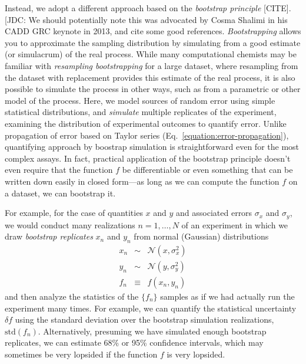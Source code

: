 \documentclass[aps,pre,twocolumn,nofootinbib,superscriptaddress,linenumbers]{revtex4-1}
\begin{document}
Instead, we adopt a different approach based on the \emph{bootstrap principle} {\color{red}[CITE]}.
{\color{red}[JDC: We should potentially note this was advocated by Cosma Shalimi in his CADD GRC keynote in 2013, and cite some good references.}
\emph{Bootstrapping} allows you to approximate the sampling distribution by simulating from a good estimate (or simulacrum) of the real process.
While many computational chemists may be familiar with \emph{resampling bootstrapping} for a large dataset, where resampling from the dataset with replacement provides this estimate of the real process, it is also possible to simulate the process in other ways, such as from a parametric or other model of the process.
Here, we model sources of random error using simple statistical distributions, and \emph{simulate} multiple replicates of the experiment, examining the distribution of experimental outcomes to quantify error.
Unlike propagation of error based on Taylor series (Eq.~\ref{equation:error-propagation}), quantifying approach by boostrap simulation is straightforward even for the most complex assays.
In fact, practical application of the bootstrap principle doesn't even require that the function $f$ be differentiable or even something that can be written down easily in closed form---as long as we can compute the function $f$ on a dataset, we can bootstrap it.

For example, for the case of  quantities $x$ and $y$ and associated errors $\sigma_x$ and $\sigma_y$, we would conduct many realizations $n = 1, \ldots, N$ of an experiment in which we draw \emph{bootstrap replicates} $x_n$ and $y_n$ from normal (Gaussian) distributions
\begin{eqnarray}
x_n &\sim& \mathcal{N}(x, \sigma^2_x) \nonumber \\
y_n &\sim& \mathcal{N}(y, \sigma^2_y) \nonumber \\
f_n &\equiv& f(x_n, y_n)
\end{eqnarray}
and then analyze the statistics of the $\{f_n\}$ samples as if we had actually run the experiment many times.
For example, we can quantify the statistical uncertainty $\delta f$ using the standard deviation over the bootstrap simulation realizations, $\mathrm{std}(f_n)$.
Alternatively, presuming we have simulated enough bootstrap replicates, we can estimate 68\% or 95\% confidence intervals, which may sometimes be very lopsided if the function $f$ is very lopsided.
\end{document}
